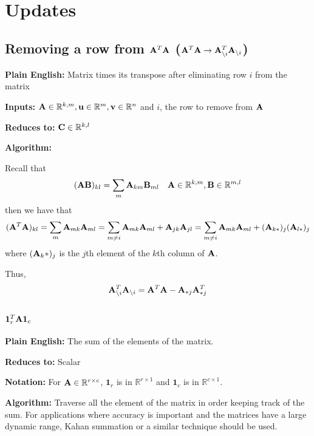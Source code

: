 \chapter{Updates}

\section{Removing a row from $\mathbf{A}^T\mathbf{A}$ ($\mathbf{A}^T\mathbf{A}\rightarrow \mathbf{A}_{\setminus i}^T\mathbf{A}_{\setminus i}$)}

\textbf{Plain English:} Matrix times its transpose after eliminating row $i$ from the matrix

\textbf{Inputs:} $\mathbf{A}\in\mathbb{R}^{k,m},\mathbf{u}\in\mathbb{R}^{m},\mathbf{v}\in\mathbb{R}^{n}$ and $i$, the row to remove from $\mathbf{A}$

\textbf{Reduces to:} $\mathbf{C}\in\mathbb{R}^{k,l}$

\textbf{Algorithm:}

Recall that
\begin{equation}
(\mathbf{A}\mathbf{B})_{kl} = \sum_m \mathbf{A}_{km}\mathbf{B}_{ml}~~~\mathbf{A}\in\mathbb{R}^{k,m},\mathbf{B}\in\mathbb{R}^{m,l}
\end{equation}
then we have that
\begin{equation}
(\mathbf{A}^T\mathbf{A})_{kl} = \sum_{m} \mathbf{A}_{mk}\mathbf{A}_{ml}=\sum_{m\ne i} \mathbf{A}_{mk}\mathbf{A}_{ml} + \mathbf{A}_{jk}\mathbf{A}_{jl}=\sum_{m\ne i} \mathbf{A}_{mk}\mathbf{A}_{ml} + (\mathbf{A}_{k*})_{j} (\mathbf{A}_{l*})_{j}
\end{equation}
where $(\mathbf{A}_k*)_{j}$ is the $j$th element of the $k$th column of $\mathbf{A}$. %

Thus,
\begin{equation}
\mathbf{A}_{\setminus i}^T\mathbf{A}_{\setminus i}=\mathbf{A}^T\mathbf{A}-\mathbf{A}_{*j}\mathbf{A}_{*j}^T
\end{equation}




\section{$\mathbf{1}_r^T \mathbf{A} \mathbf{1}_c$}

\textbf{Plain English:} The sum of the elements of the matrix.

\textbf{Reduces to:} Scalar

\textbf{Notation:} For $\mathbf{A} \in \mathbb{R}^{r\times c}$, $\mathbf{1}_r$ is in $\mathbb{R}^{r \times 1}$ and $\mathbf{1}_c$ is in $\mathbb{R}^{c \times 1}$.

\textbf{Algorithm:} Traverse all the element of the matrix in order keeping track of the sum. For applications where accuracy is important and the matrices have a large dynamic range, Kahan summation or a similar technique should be used.

